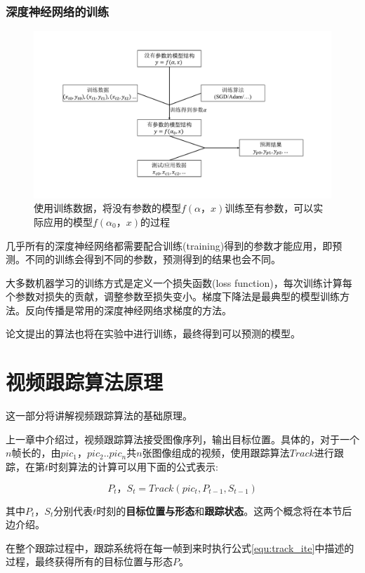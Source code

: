 \subsubsection{深度神经网络的训练}
\par
\begin{figure}[htbp!]
    \centering
    \includegraphics[width = 1.\textwidth]{chap/img/model_learning.pdf}
    \caption{使用训练数据，将没有参数的模型$f(\alpha，x)$训练至有参数，可以实际应用的模型$f(\alpha_0，x)$的过程}
    \label{fig:model_learning}
\end{figure}
几乎所有的深度神经网络都需要配合训练(training)得到的参数才能应用，即预测。不同的训练会得到不同的参数，预测得到的结果也会不同。
\par
大多数机器学习的训练方式是定义一个损失函数(loss function)，每次训练计算每个参数对损失的贡献，调整参数至损失变小。梯度下降法是最典型的模型训练方法。反向传播是常用的深度神经网络求梯度的方法。
\par
论文提出的算法也将在实验中进行训练，最终得到可以预测的模型。

\section{视频跟踪算法原理}
这一部分将讲解视频跟踪算法的基础原理。
\par
上一章中介绍过，视频跟踪算法接受图像序列，输出目标位置。具体的，对于一个$n$帧长的，由$pic_1，pic_2..pic_n$共$n$张图像组成的视频，使用跟踪算法$Track$进行跟踪，在第$t$时刻算法的计算可以用下面的公式表示:
\par
\begin{equation}\label{equ:track_ite}  P_t，S_t=Track(pic_{t},P_{t-1},S_{t-1})  \end{equation}
\par
其中$P_t$，$S_t$分别代表$t$时刻的\textbf{目标位置与形态}和\textbf{跟踪状态}。这两个概念将在本节后边介绍。
\par
在整个跟踪过程中，跟踪系统将在每一帧到来时执行公式\ref{equ:track_ite}中描述的过程，最终获得所有的目标位置与形态$P$。
\par
